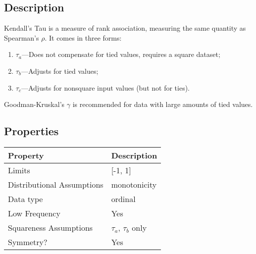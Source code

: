 \documentclass[11pt]{article}
\begin{document}
\subsection{Description}
Kendall's Tau is a measure of rank association, measuring the same quantity as Spearman's $\rho$.  It comes in three forms:
\begin{enumerate}
\item $\tau_{a}$---Does not compensate for tied values, requires a square dataset;
\item $\tau_{b}$---Adjusts for tied values;
\item $\tau_{c}$---Adjusts for nonsquare input values (but not for ties).
\end{enumerate}
Goodman-Kruskal's $\gamma$ is recommended for data with large amounts of tied values.

\subsection{Properties}
\begin{tabular}{| l || l |}
    \hline
    {\bf Property} & {\bf Description} \\
    \hline
    Limits & [-1, 1] \\ \hline

    Distributional Assumptions & monotonicity\\ \hline

    Data type & ordinal \\ \hline

    Low Frequency & Yes \\ \hline

    Squareness Assumptions & $\tau_a$, $\tau_b$ only \\ \hline
    
    Symmetry? & Yes \\ \hline

\end{tabular}
\end{document}
